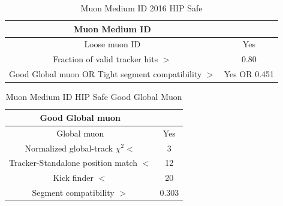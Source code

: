 \begin{itemize}
\begin{table}[htbp]
\fontsize{10 pt}{1.2 em}
\selectfont
\begin{centering}
\caption{\label{tab:MuonMediumID} Muon Medium ID 2016 HIP Safe}
\hspace*{-4ex}
\begin{lrbox}{\closureBox}
\begin{tabular}{|c|c|}
\hline
  Muon Medium ID                                      &               \\
\hline
  Loose muon ID                                       & Yes           \\
\hline
  Fraction of valid tracker hits $>$                  & 0.80          \\
\hline
  Good Global muon OR Tight segment compatibility $>$ & Yes OR 0.451 \\
\hline
\end{tabular}
\end{lrbox}
\scalebox{0.80}{\usebox{\closureBox}}
\par\end{centering}
\end{table}

\begin{table}[htbp]
\fontsize{10 pt}{1.2 em}
\selectfont
\begin{centering}
\caption{\label{tab:MuonMediumIDGoodGlobalMuon} Muon Medium ID HIP Safe Good Global Muon}
\hspace*{-4ex}
\begin{lrbox}{\closureBox}
\begin{tabular}{|c|c|}
\hline
  Good Global muon                      &       \\
\hline
  Global muon                           & Yes   \\
\hline
  Normalized global-track $\chi^{2} <$  & 3     \\
\hline
  Tracker-Standalone position match $<$ & 12    \\
\hline
  Kick finder $<$                       & 20    \\
\hline
  Segment compatibility $>$             & 0.303 \\
\hline
\end{tabular}
\end{lrbox}
\scalebox{0.80}{\usebox{\closureBox}}
\par\end{centering}
\end{table}


\end{itemize}
